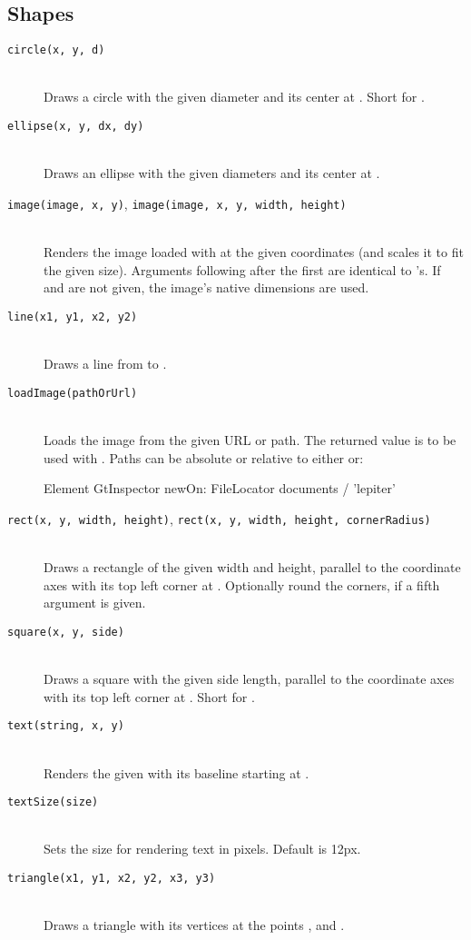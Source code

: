 \subsection{Shapes}
\begin{description}
\item[\texttt{circle(x, y, d)}] \hfill \\
	Draws a circle with the given diameter and its center at . Short for .
\item[\texttt{ellipse(x, y, dx, dy)}] \hfill \\
	Draws an ellipse with the given diameters and its center at .
\item[\texttt{image(image, x, y)}, \texttt{image(image, x, y, width, height)}] \hfill \\
	Renders the image loaded with  at the given coordinates (and scales it to fit the given size). Arguments following after the first are identical to 's. If  and  are not given, the image's native dimensions are used.
\item[\texttt{line(x1, y1, x2, y2)}] \hfill \\
	Draws a line from  to .
\item[\texttt{loadImage(pathOrUrl)}] \hfill \\
	Loads the image from the given URL or path. The returned value is to be used with .
Paths can be absolute or relative to either  or:
\begin{code}
Element
GtInspector newOn: FileLocator documents / 'lepiter'
\end{code}
\item[\texttt{rect(x, y, width, height)}, \texttt{rect(x, y, width, height, cornerRadius)}] \hfill \\
	Draws a rectangle of the given width and height, parallel to the coordinate axes with its top left corner at . Optionally round the corners, if a fifth argument is given.
\item[\texttt{square(x, y, side)}] \hfill \\
	Draws a square with the given side length, parallel to the coordinate axes with its top left corner at . Short for .
\item[\texttt{text(string, x, y)}] \hfill \\
	Renders the given  with its baseline starting at .
\item[\texttt{textSize(size)}] \hfill \\
	Sets the size for rendering text in pixels. Default is 12px.
\item[\texttt{triangle(x1, y1, x2, y2, x3, y3)}] \hfill \\
	Draws a triangle with its vertices at the points ,  and .
\end{description}

